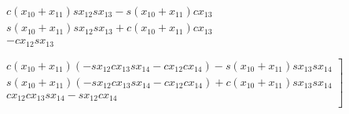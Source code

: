 \begin{multline}
\begin{matrix}
c\left(x_{10}+x_{11}\right) sx_{12} sx_{13} -s\left(x_{10}+x_{11}\right) cx_{13} \\
s\left(x_{10}+x_{11}\right) sx_{12} sx_{13} +c\left(x_{10}+x_{11}\right) cx_{13} \\
-cx_{12} sx_{13} \\
\end{matrix}
\\
\left.
\begin{matrix}
c\left(x_{10}+x_{11}\right)\left(-sx_{12} cx_{13} sx_{14} -cx_{12} cx_{14} \right)-s\left(x_{10}+x_{11}\right) sx_{13} sx_{14} \\
s\left(x_{10}+x_{11}\right)\left(-sx_{12} cx_{13} sx_{14} -cx_{12} cx_{14} \right)+c\left(x_{10}+x_{11}\right) sx_{13} sx_{14} \\
 cx_{12} cx_{13} sx_{14} -sx_{12} cx_{14} \\
\end{matrix}
\right]\\
\end{multline}


